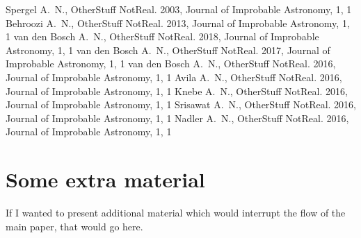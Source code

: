 \documentclass[fleqn,usenatbib]{mnras}
\begin{document}
\begin{thebibliography}{99}
Spergel A.~N., OtherStuff NotReal. 2003, Journal of Improbable Astronomy, 1, 1
Behroozi A.~N., OtherStuff NotReal. 2013, Journal of Improbable Astronomy, 1, 1
van den Bosch A.~N., OtherStuff NotReal. 2018, Journal of Improbable Astronomy, 1, 1
van den Bosch A.~N., OtherStuff NotReal. 2017, Journal of Improbable Astronomy, 1, 1
van den Bosch A.~N., OtherStuff NotReal. 2016, Journal of Improbable Astronomy, 1, 1
Avila A.~N., OtherStuff NotReal. 2016, Journal of Improbable Astronomy, 1, 1
Knebe A.~N., OtherStuff NotReal. 2016, Journal of Improbable Astronomy, 1, 1
Srisawat A.~N., OtherStuff NotReal. 2016, Journal of Improbable Astronomy, 1, 1
Nadler A.~N., OtherStuff NotReal. 2016, Journal of Improbable Astronomy, 1, 1
\end{thebibliography}



\appendix

\section{Some extra material}

If I wanted to present additional material which would interrupt the flow of the main paper, that would go here.



\bsp	%
\label{lastpage}
\end{document}
